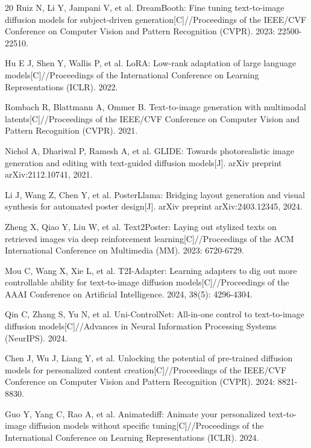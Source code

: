 \documentclass[12pt,a4paper]{ctexart}
\begin{document}
\begin{thebibliography}{20}
 Ruiz N, Li Y, Jampani V, et al. DreamBooth: Fine tuning text-to-image diffusion models for subject-driven generation[C]//Proceedings of the IEEE/CVF Conference on Computer Vision and Pattern Recognition (CVPR). 2023: 22500-22510.

 Hu E J, Shen Y, Wallis P, et al. LoRA: Low-rank adaptation of large language models[C]//Proceedings of the International Conference on Learning Representations (ICLR). 2022.

 Rombach R, Blattmann A, Ommer B. Text-to-image generation with multimodal latents[C]//Proceedings of the IEEE/CVF Conference on Computer Vision and Pattern Recognition (CVPR). 2021.

 Nichol A, Dhariwal P, Ramesh A, et al. GLIDE: Towards photorealistic image generation and editing with text-guided diffusion models[J]. arXiv preprint arXiv:2112.10741, 2021.

 Li J, Wang Z, Chen Y, et al. PosterLlama: Bridging layout generation and visual synthesis for automated poster design[J]. arXiv preprint arXiv:2403.12345, 2024.

 Zheng X, Qiao Y, Liu W, et al. Text2Poster: Laying out stylized texts on retrieved images via deep reinforcement learning[C]//Proceedings of the ACM International Conference on Multimedia (MM). 2023: 6720-6729.

 Mou C, Wang X, Xie L, et al. T2I-Adapter: Learning adapters to dig out more controllable ability for text-to-image diffusion models[C]//Proceedings of the AAAI Conference on Artificial Intelligence. 2024, 38(5): 4296-4304.

 Qin C, Zhang S, Yu N, et al. Uni-ControlNet: All-in-one control to text-to-image diffusion models[C]//Advances in Neural Information Processing Systems (NeurIPS). 2024.

 Chen J, Wu J, Liang Y, et al. Unlocking the potential of pre-trained diffusion models for personalized content creation[C]//Proceedings of the IEEE/CVF Conference on Computer Vision and Pattern Recognition (CVPR). 2024: 8821-8830.

 Guo Y, Yang C, Rao A, et al. Animatediff: Animate your personalized text-to-image diffusion models without specific tuning[C]//Proceedings of the International Conference on Learning Representations (ICLR). 2024.

\end{thebibliography}
\end{document}
